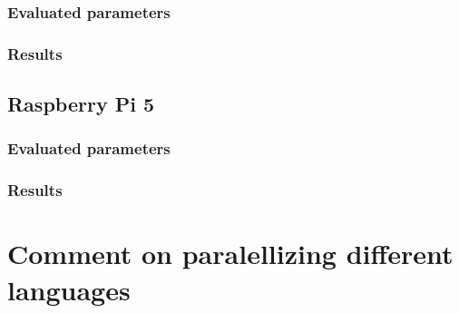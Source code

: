 \subsubsection{Evaluated parameters}
\subsubsection{Results}

\subsection{Raspberry Pi 5}
\subsubsection{Evaluated parameters}
\subsubsection{Results}


\section{Comment on paralellizing different languages}





